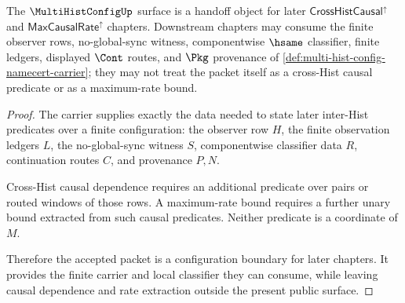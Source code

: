 \begin{theorem}
\label{thm:multihistconfig-crosshist-maxcausal-handoff}
The $\MultiHistConfigUp$ surface is a handoff object for later $\mathsf{CrossHistCausal}^{\uparrow}$ and $\mathsf{MaxCausalRate}^{\uparrow}$ chapters. Downstream chapters may consume the finite observer rows, no-global-sync witness, componentwise $\hsame$ classifier, finite ledgers, displayed $\Cont$ routes, and $\Pkg$ provenance of \autoref{def:multi-hist-config-namecert-carrier}; they may not treat the packet itself as a cross-Hist causal predicate or as a maximum-rate bound.
\end{theorem}
\begin{proof}
The carrier supplies exactly the data needed to state later inter-Hist predicates over a finite configuration: the observer row $H$, the finite observation ledgers $L$, the no-global-sync witness $S$, componentwise classifier data $R$, continuation routes $C$, and provenance $P,N$.

Cross-Hist causal dependence requires an additional predicate over pairs or routed windows of those rows. A maximum-rate bound requires a further unary bound extracted from such causal predicates. Neither predicate is a coordinate of $M$.

Therefore the accepted packet is a configuration boundary for later chapters. It provides the finite carrier and local classifier they can consume, while leaving causal dependence and rate extraction outside the present public surface.
\end{proof}

